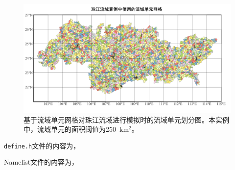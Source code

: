\begin{figure}[htpb]
    \centering
    \includegraphics[width=\textwidth]{figures/Example06_PearlRiverMesh.pdf}
    \caption{基于流域单元网格对珠江流域进行模拟时的流域单元划分图。本实例中，流域单元的面积阈值为250~$\mathrm{km^2}$。}
    \label{fig:fig_pearlriver}
\end{figure}

\texttt{define.h}文件的内容为，


Namelist文件的内容为，


